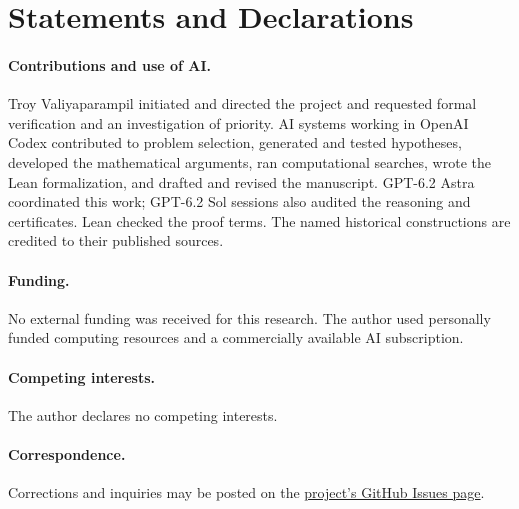\documentclass[11pt]{article}
\begin{document}
\section*{Statements and Declarations}
\paragraph{Contributions and use of AI.}
Troy Valiyaparampil initiated and directed the project and requested
formal verification and an investigation of priority. AI systems
working in OpenAI Codex contributed to problem selection, generated
and tested hypotheses, developed the mathematical arguments, ran
computational searches, wrote the Lean formalization, and drafted
and revised the manuscript. GPT-6.2 Astra coordinated this work;
GPT-6.2 Sol sessions also audited the reasoning and certificates.
Lean checked the proof terms. The named historical constructions are
credited to their published sources.

\paragraph{Funding.} No external funding was received for this research. The author used personally funded computing resources and a commercially available AI subscription.
\paragraph{Competing interests.} The author declares no competing interests.
\paragraph{Correspondence.} Corrections and inquiries may be posted on the
\href{https://github.com/troytsv/project-lemma/issues}{project's GitHub Issues page}.



\end{document}
